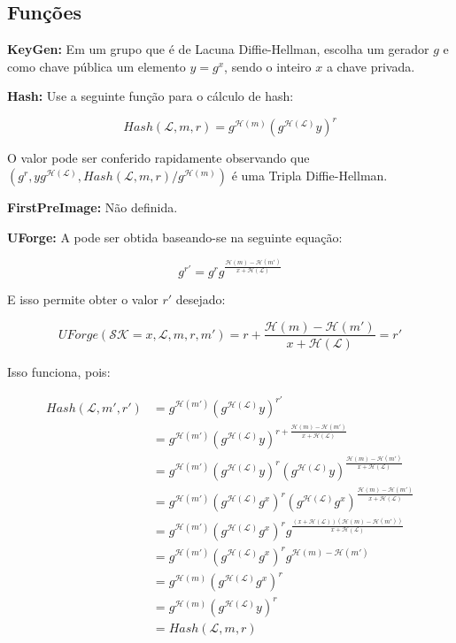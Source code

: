 \documentclass[a4paper]{article}
\begin{document}
\subsection{Funções}

\textbf{KeyGen: }Em um grupo que é de Lacuna Diffie-Hellman, escolha
um gerador $g$ e como chave pública um elemento $y=g^x$, sendo o
inteiro $x$ a chave privada.

\textbf{Hash: }Use a seguinte função para o cálculo de hash:

$$
Hash(\mathcal{L}, m, r) = g^{\mathcal{H}(m)}(g^{\mathcal{H}(\mathcal{L})}y)^r
$$

O valor pode ser conferido rapidamente observando que $(g^r,
yg^{\mathcal{H}(\mathcal{L})}, Hash(\mathcal{L}, m,
r)/g^{\mathcal{H}(m)})$ é uma Tripla Diffie-Hellman.

\textbf{FirstPreImage:} Não definida.

\textbf{UForge:} A pode ser obtida baseando-se na seguinte equação:

$$
g^{r'}=g^rg^{\frac{\mathcal{H}(m)-\mathcal{H}(m')}{x+\mathcal{H}(\mathcal{L})}}
$$

E isso permite obter o valor $r'$ desejado:

$$
UForge(\mathcal{SK}=x, \mathcal{L}, m, r, m') = r + \frac{\mathcal{H}(m)-\mathcal{H}(m')}{x+\mathcal{H}(\mathcal{L})} = r'
$$

Isso funciona, pois:

\begin{equation}
\begin{split}
  Hash(\mathcal{L}, m', r') &= g^{\mathcal{H}(m')}(g^{\mathcal{H}(\mathcal{L})}y)^{r'}\\
  &=g^{\mathcal{H}(m')}(g^{\mathcal{H}(\mathcal{L})}y)^{r + \frac{\mathcal{H}(m)-\mathcal{H}(m')}{x+\mathcal{H}(\mathcal{L})}}\\
  &=g^{\mathcal{H}(m')}(g^{\mathcal{H}(\mathcal{L})}y)^{r}(g^{\mathcal{H}(\mathcal{L})}y)^{\frac{\mathcal{H}(m)-\mathcal{H}(m')}{x+\mathcal{H}(\mathcal{L})}}\\
  &=g^{\mathcal{H}(m')}(g^{\mathcal{H}(\mathcal{L})}g^x)^{r}(g^{\mathcal{H}(\mathcal{L})}g^x)^{\frac{\mathcal{H}(m)-\mathcal{H}(m')}{x+\mathcal{H}(\mathcal{L})}}\\
  &=g^{\mathcal{H}(m')}(g^{\mathcal{H}(\mathcal{L})}g^x)^{r}g^{\frac{(x+\mathcal{H}(\mathcal{L}))(\mathcal{H}(m)-\mathcal{H}(m'))}{x+\mathcal{H}(\mathcal{L})}}\\
  &=g^{\mathcal{H}(m')}(g^{\mathcal{H}(\mathcal{L})}g^x)^{r}g^{\mathcal{H}(m)-\mathcal{H}(m')}\\
  &=g^{\mathcal{H}(m)}(g^{\mathcal{H}(\mathcal{L})}g^x)^{r}\\
  &=g^{\mathcal{H}(m)}(g^{\mathcal{H}(\mathcal{L})}y)^{r}\\
  &=Hash(\mathcal{L}, m, r)\\
\end{split}
\end{equation}
\end{document}
